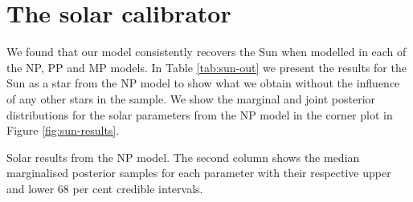 \documentclass[a4paper,fleqn,usenatbib]{mnras}
\begin{document}



\section{The solar calibrator}\label{sec:sun-res}

We found that our model consistently recovers the Sun when modelled in each of the NP, PP and MP models. In Table \ref{tab:sun-out} we present the results for the Sun as a star from the NP model to show what we obtain without the influence of any other stars in the sample. We show the marginal and joint posterior distributions for the solar parameters from the NP model in the corner plot in Figure \ref{fig:sun-results}.

\begin{table}
    \centering
    \caption{Solar results from the NP model. The second column shows the median marginalised posterior samples for each parameter with their respective upper and lower 68 per cent credible intervals.}
    \label{tab:sun-out}
    
\end{table}
\end{document}
